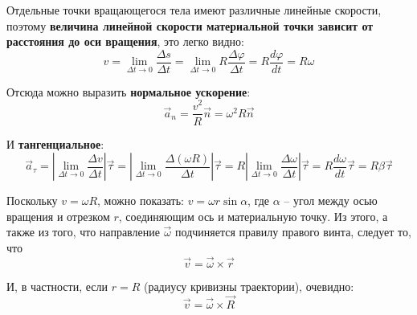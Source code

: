 \documentclass{article}
\begin{document}
    \par
      Отдельные точки вращающегося тела имеют различные линейные скорости, поэтому \textbf{величина линейной скорости материальной точки зависит от расстояния до оси вращения}, это легко видно:
      \begin{equation}
	v=\lim_{\Delta t\rightarrow 0}{\frac{\Delta s}{\Delta t}}=\lim_{\Delta t\rightarrow 0}{R\frac{\Delta\varphi}{\Delta t}}=R\frac{d\varphi}{dt}=R\omega
      \end{equation}
    \par
      Отсюда можно выразить \textbf{нормальное ускорение}:
      \begin{equation}
	\vec a_n=\frac{v^2}{R}\vec n=\omega^2R\vec n
      \end{equation}
    \par
      И \textbf{тангенциальное}:
      \begin{equation}
	\vec a_\tau=|\lim_{\Delta t\rightarrow 0}{\frac{\Delta v}{\Delta t}}|\vec\tau=|\lim_{\Delta t\rightarrow 0}{\frac{\Delta (\omega R)}{\Delta t}}|\vec\tau=R|\lim_{\Delta t\rightarrow 0}{\frac{\Delta \omega}{\Delta t}}|\vec\tau=R\frac{d\omega}{dt}\vec\tau=R\beta\vec\tau
      \end{equation}
    \par
      Поскольку $v=\omega R$, можно показать: $v=\omega r \sin\alpha$, где $\alpha$ -- угол между осью вращения и отрезком $r$, соединяющим ось и материальную точку. Из этого, а также из того, что направление $\vec\omega$ подчиняется правилу правого винта, следует то, что
      \begin{equation}
	\vec v=\vec\omega\times\vec r
      \end{equation}
    \par
      И, в частности, если $r=R$ (радиусу кривизны траектории), очевидно:
      \begin{equation}
	\vec v=\vec\omega\times\vec R
      \end{equation}
  \clearpage
    
\end{document}

